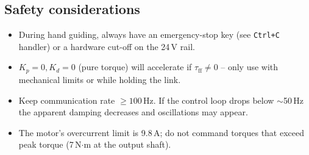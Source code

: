 \documentclass[11pt,a4paper]{article}
\begin{document}
\subsection{Safety considerations}
\begin{itemize}
  \item During hand guiding, always have an emergency-stop key (see
        \texttt{Ctrl+C} handler) or a hardware cut-off on the 24\,V rail.
  \item $K_p=0, K_d=0$ (pure torque) will accelerate if $\tau_{\text{ff}}\neq0$ --
        only use with mechanical limits or while holding the link.
  \item Keep communication rate $\ge 100$\,Hz.  If the control loop drops
        below $\sim$50\,Hz the apparent damping decreases and oscillations
        may appear.
  \item The motor's overcurrent limit is 9.8\,A; do not command torques
        that exceed peak torque (7\,N$\cdot$m at the output shaft).
\end{itemize}

\end{document}
